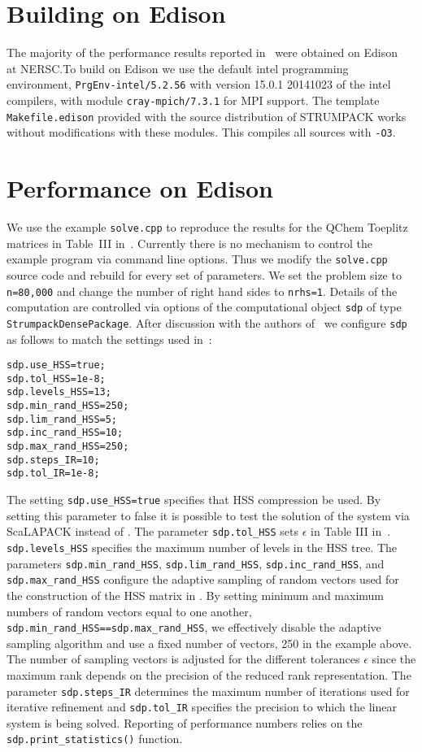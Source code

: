 \documentclass{acmsmall}
\begin{document}
\section{Building on Edison}

The majority of the performance results reported
in~\cite{rouet:strumpack} were obtained on Edison~\cite{Edison} at
NERSC.\@ To build \strumpack{} on Edison we use the default intel
programming environment, \verb!PrgEnv-intel/5.2.56!  with version
15.0.1 20141023 of the intel compilers, with module
\verb!cray-mpich/7.3.1! for MPI support.  The template
\verb!Makefile.edison! provided with the source distribution of
STRUMPACK works without modifications with these modules.  This
compiles all sources with \verb!-O3!.


\section{Performance on Edison}

We use the example \verb!solve.cpp! to reproduce the results for
the QChem Toeplitz matrices in Table~III
in~\cite{rouet:strumpack}.  Currently there is no mechanism to
control the example program via command line options.  Thus we
modify the \verb!solve.cpp! source code and rebuild for every set
of parameters.  We set the problem size to \verb!n=80,000! and
change the number of right hand sides to \verb!nrhs=1!.  Details
of the computation are controlled via options of the
computational object \verb!sdp! of type
\verb!StrumpackDensePackage!.  After discussion with the authors
of~\cite{rouet:strumpack} we configure \verb!sdp! as follows to
match the settings used in~\cite{rouet:strumpack}:
\begin{verbatim}
sdp.use_HSS=true;
sdp.tol_HSS=1e-8;
sdp.levels_HSS=13;
sdp.min_rand_HSS=250;
sdp.lim_rand_HSS=5;
sdp.inc_rand_HSS=10;
sdp.max_rand_HSS=250;
sdp.steps_IR=10;
sdp.tol_IR=1e-8;
\end{verbatim}
The setting \verb!sdp.use_HSS=true! specifies that HSS
compression be used.  By setting this parameter to false it is
possible to test the solution of the system via ScaLAPACK instead
of \strumpack{}.  The parameter \verb!sdp.tol_HSS! sets
$\epsilon$ in Table III in~\cite{rouet:strumpack}.
\verb!sdp.levels_HSS! specifies the maximum number of levels in
the HSS tree.  The parameters \verb!sdp.min_rand_HSS!,
\verb!sdp.lim_rand_HSS!, \verb!sdp.inc_rand_HSS!, and
\verb!sdp.max_rand_HSS! configure the adaptive sampling of random
vectors used for the construction of the HSS matrix in
\strumpack{}.  By setting minimum and maximum numbers of random
vectors equal to one another,
\verb!sdp.min_rand_HSS==sdp.max_rand_HSS!, we effectively disable
the adaptive sampling algorithm and use a fixed number of
vectors, 250 in the example above.  The number of sampling
vectors is adjusted for the different tolerances $\epsilon$ since
the maximum rank depends on the precision of the reduced rank
representation.  The parameter \verb!sdp.steps_IR! determines the
maximum number of iterations used for iterative refinement and
\verb!sdp.tol_IR!  specifies the precision to which the linear
system is being solved.  Reporting of performance numbers relies
on the \verb!sdp.print_statistics()! function.
\end{document}
